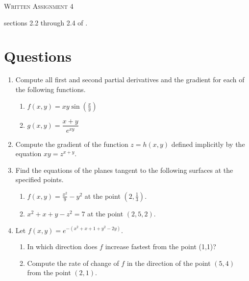 \documentclass{article}
\date{}
\begin{document}
\begin{center}
\textsc{\LARGE Written Assignment 4}\\[0.5cm]
\end{center}
\From sections 2.2 through 2.4 of \VCT.

\section*{Questions}

\begin{enumerate}
\item

Compute all first and second partial derivatives and the gradient 
for each of the following functions.
\begin{enumerate}
 \item $f(x,y) = xy\sin(\frac{x}{y})$
 \item $g(x,y) = \dfrac{x+y}{e^{xy}}$
\end{enumerate}

\item

Compute the gradient of the function $z = h(x, y)$ defined implicitly by the
equation $xy = z^{x+y}$.

\item

Find the equations of the planes tangent to the following surfaces
at the specified points.
\begin{enumerate}
 \item $f(x,y) = \frac{x^2}{9} - y^2$ at the point $(2, \frac{1}{3})$.
 \item $x^2 + x + y - z^2 = 7$ at the point $(2, 5, 2)$.
\end{enumerate}

\item

Let $f(x,y) = e^{-(x^2+x+1+y^2-2y)}$.
\begin{enumerate}
 \item In which direction does $f$ increase fastest from the point
  (1,1)?
 \item Compute the rate of change of $f$ in the direction of the
  point $(5,4)$ from the point $(2,1)$.
\end{enumerate}


\end{enumerate}
\end{document}
